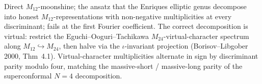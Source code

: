 \begin{remark}
\label{rem:bkm-enriques-m12-virtual-not-direct}
Direct $M_{12}$-moonshine; the ansatz that the Enriques elliptic
genus decompose into honest $M_{12}$-representations with non-negative
multiplicities at every discriminant; fails at the first Fourier
coefficient. The correct decomposition is virtual: restrict the
Eguchi--Ooguri--Tachikawa $M_{24}$-virtual-character spectrum along
$M_{12}\hookrightarrow M_{24}$, then halve via the $\iota$-invariant
projection (Borisov--Libgober 2000, Thm~4.1). Virtual-character
multiplicities alternate in sign by discriminant parity modulo four,
matching the massive-short / massive-long parity of the superconformal
$N = 4$ decomposition.
\end{remark}

